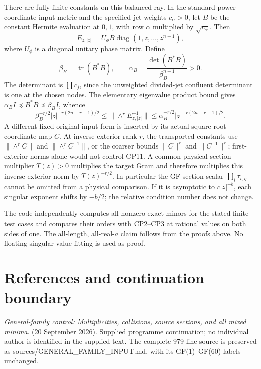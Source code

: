 \documentclass[
  11pt,
]{article}
\begin{document}
There are fully finite constants on this balanced ray. In the standard
power-coordinate input metric and the specified jet weights
\(c_\alpha>0\), let \(B\) be the constant Hermite evaluation at \(0,1\),
with row \(\alpha\) multiplied by \(\sqrt{c_\alpha}\). Then \[
E_{z,|z|}=U_\phi B\operatorname{diag}(1,z,\ldots,z^{n-1}),
\] where \(U_\phi\) is a diagonal unitary phase matrix. Define \[
\beta_B=\operatorname{tr}(B^*B),\qquad
\alpha_B=\frac{\det(B^*B)}{\beta_B^{n-1}}>0.
\] The determinant is \(\prod c_j\), since the unweighted divided-jet
confluent determinant is one at the chosen nodes. The elementary
eigenvalue product bound gives
\(\alpha_B I\preceq B^*B\preceq\beta_B I\), whence \[
\boxed{
\beta_B^{-r/2}|z|^{-r(2n-r-1)/2}
\le\|\wedge^rE_{z,|z|}^{-1}\|
\le\alpha_B^{-r/2}|z|^{-r(2n-r-1)/2}.
} \tag{CP11}
\] A different fixed original input form is inserted by its actual
square-root coordinate map \(C\). At inverse exterior rank \(r\), the
transported constants use \(\|\wedge^r C\|\) and
\(\|\wedge^r C^{-1}\|\), or the coarser bounds \(\|C\|^r\) and
\(\|C^{-1}\|^r\); first-exterior norms alone would not control CP11. A
common physical section multiplier \(T(z)>0\) multiplies the target Gram
and therefore multiplies this inverse-exterior norm by \(T(z)^{-r/2}\).
In particular the GF section scalar \(\prod_i\tau_{i,\eta}\) cannot be
omitted from a physical comparison. If it is asymptotic to
\(c|z|^{-b}\), each singular exponent shifts by \(-b/2\); the relative
condition number does not change.

The code independently computes all nonzero exact minors for the stated
finite test cases and compares their orders with CP2--CP3 at rational
values on both sides of one. The all-length, all-real-\(a\) claim
follows from the proofs above. No floating singular-value fitting is
used as proof.

\newpage

\newpage

\section{References and continuation
boundary}\label{references-and-continuation-boundary}

\emph{General-family control: Multiplicities, collisions, source
sections, and all mixed minima}. (20 September 2026). Supplied programme
continuation; no individual author is identified in the supplied text.
The complete 979-line source is preserved as
sources/GENERAL\_FAMILY\_INPUT.md, with its GF(1)--GF(60) labels
unchanged.
\end{document}
